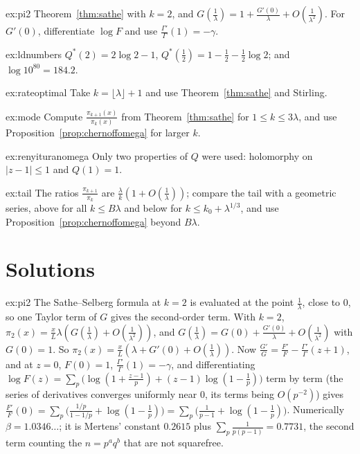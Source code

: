 \begin{hint}{ex:pi2}
Theorem~\ref{thm:sathe} with $k=2$, and $G(\frac1\lambda)=1+\frac{G'(0)}\lambda+O(\frac1{\lambda^2})$. For $G'(0)$, differentiate $\log F$ and use $\frac{\Gamma'}\Gamma(1)=-\gamma$.
\end{hint}
\begin{hint}{ex:ldnumbers}
$Q^*(2)=2\log2-1$, $Q^*(\frac12)=1-\frac12-\frac12\log2$; and $\log10^{80}=184.2$.
\end{hint}
\begin{hint}{ex:rateoptimal}
Take $k=\lfloor\lambda\rfloor+1$ and use Theorem~\ref{thm:sathe} and Stirling.
\end{hint}
\begin{hint}{ex:mode}
Compute $\frac{\pi_{k+1}(x)}{\pi_k(x)}$ from Theorem~\ref{thm:sathe} for $1\le k\le3\lambda$, and use Proposition~\ref{prop:chernoffomega} for larger $k$.
\end{hint}
\begin{hint}{ex:renyituranomega}
Only two properties of $Q$ were used: holomorphy on $|z-1|\le1$ and $Q(1)=1$.
\end{hint}
\begin{hint}{ex:tail}
The ratios $\frac{\pi_{k+1}}{\pi_k}$ are $\frac\lambda k(1+O(\frac1\lambda))$; compare the tail with a geometric series, above for all $k\le B\lambda$ and below for $k\le k_0+\lambda^{1/3}$, and use Proposition~\ref{prop:chernoffomega} beyond $B\lambda$.
\end{hint}

\section{Solutions}

\begin{solution}{ex:pi2}
\idea The Sathe--Selberg formula at $k=2$ is evaluated at the point $\frac1\lambda$, close to $0$, so one Taylor term of $G$ gives the second-order term.
\writeup With $k=2$, $\pi_2(x)=\frac xL\lambda(G(\frac1\lambda)+O(\frac1{\lambda^2}))$, and $G(\frac1\lambda)=G(0)+\frac{G'(0)}\lambda+O(\frac1{\lambda^2})$ with $G(0)=1$. So $\pi_2(x)=\frac xL(\lambda+G'(0)+O(\frac1\lambda))$. Now $\frac{G'}G=\frac{F'}F-\frac{\Gamma'}\Gamma(z+1)$, and at $z=0$, $F(0)=1$, $\frac{\Gamma'}\Gamma(1)=-\gamma$, and differentiating $\log F(z)=\sum_p\bigl(\log(1+\frac{z-1}p)+(z-1)\log(1-\frac1p)\bigr)$ term by term (the series of derivatives converges uniformly near $0$, its terms being $O(p^{-2})$) gives $\frac{F'}F(0)=\sum_p\bigl(\frac{1/p}{1-1/p}+\log(1-\frac1p)\bigr)=\sum_p\bigl(\frac1{p-1}+\log(1-\frac1p)\bigr)$. Numerically $\beta=1.0346\ldots$; it is Mertens' constant $0.2615$ plus $\sum_p\frac1{p(p-1)}=0.7731$, the second term counting the $n=p^aq^b$ that are not squarefree.
\end{solution}

